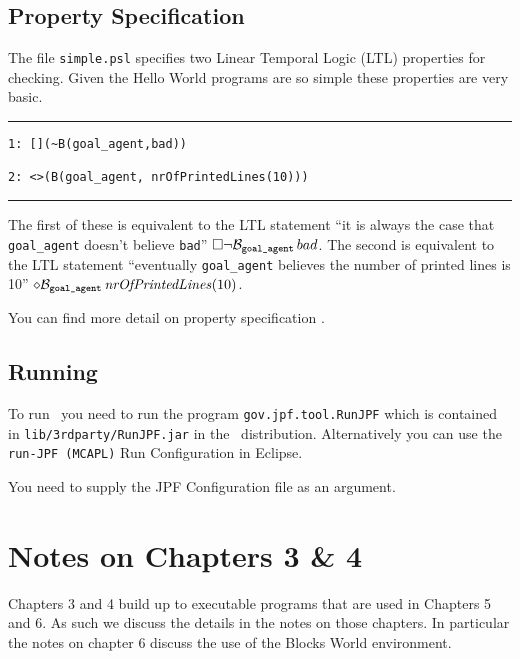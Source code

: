 \subsection{Property Specification}
The file \texttt{simple.psl} specifies two Linear Temporal Logic (LTL) properties for checking.  Given the Hello World programs are so simple these properties are very basic.  

\noindent\rule{\textwidth}{1pt}
\begin{small}
\begin{verbatim}
1: [](~B(goal_agent,bad))

2: <>(B(goal_agent, nrOfPrintedLines(10)))
\end{verbatim}
\end{small}
\rule{\textwidth}{1pt}

The first of these is equivalent to the LTL statement ``it is always the case that \texttt{goal\_agent} doesn't believe \texttt{bad}'' $\Box \neg \mathrm{{\cal B}}_{\texttt{goal\_agent}} \, bad$.  The second is equivalent to the LTL statement ``eventually \texttt{goal\_agent} believes the number of printed lines is 10'' $\diamond \mathrm{{\cal B}}_{\texttt{goal\_agent}} \, \mathit{nrOfPrintedLines}(10)$.

You can find more detail on property specification .

\subsection{Running \ajpf}
To run \ajpf\ you need to run the program \texttt{gov.jpf.tool.RunJPF} which is contained in \texttt{lib/3rdparty/RunJPF.jar} in the \mcapl\ distribution.  Alternatively you can use the \texttt{run-JPF (MCAPL)} Run Configuration in Eclipse.

You need to supply the JPF Configuration file as an argument.  

\section{Notes on Chapters 3 \& 4}

Chapters 3 and 4 build up to executable programs that are used in Chapters 5 and 6.  As such we discuss the details in the notes on those chapters.  In particular the notes on chapter 6 discuss the use of the Blocks World environment.

